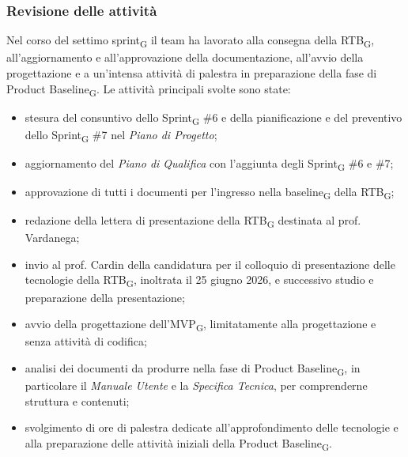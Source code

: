 ﻿\documentclass[a4paper, 10pt, colorlinks=true, linkcolor=black, urlcolor=blue, citecolor=blue, hidelinks]{article}
\begin{document}
\subsubsection{Revisione delle attività}
Nel corso del settimo sprint\textsubscript{G} il team ha lavorato alla consegna della RTB\textsubscript{G}, all'aggiornamento e all'approvazione della documentazione, all'avvio della progettazione e a un'intensa attività di palestra in preparazione della fase di Product Baseline\textsubscript{G}. Le attività principali svolte sono state:
\begin{itemize}
    \item stesura del consuntivo dello Sprint\textsubscript{G} \#6 e della pianificazione e del preventivo dello Sprint\textsubscript{G} \#7 nel \textit{Piano di Progetto};
    \item aggiornamento del \textit{Piano di Qualifica} con l'aggiunta degli Sprint\textsubscript{G} \#6 e \#7;
    \item approvazione di tutti i documenti per l'ingresso nella baseline\textsubscript{G} della RTB\textsubscript{G};
    \item redazione della lettera di presentazione della RTB\textsubscript{G} destinata al prof. Vardanega;
    \item invio al prof. Cardin della candidatura per il colloquio di presentazione delle tecnologie della RTB\textsubscript{G}, inoltrata il 25 giugno 2026, e successivo studio e preparazione della presentazione;
    \item avvio della progettazione dell'MVP\textsubscript{G}, limitatamente alla progettazione e senza attività di codifica;
    \item analisi dei documenti da produrre nella fase di Product Baseline\textsubscript{G}, in particolare il \textit{Manuale Utente} e la \textit{Specifica Tecnica}, per comprenderne struttura e contenuti;
    \item svolgimento di ore di palestra dedicate all'approfondimento delle tecnologie e alla preparazione delle attività iniziali della Product Baseline\textsubscript{G}.
\end{itemize}
\end{document}
